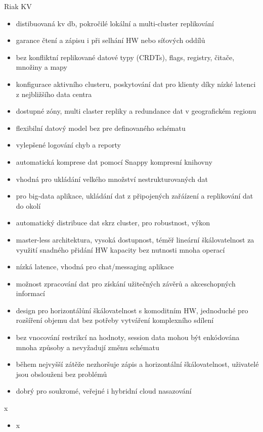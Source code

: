 \documentclass{article}
\begin{document}
	\begin{subsubsection}{Riak KV}
		\begin{itemize}
			\item distibuovaná kv db, pokročilé lokální a multi-cluster replikování
			\item garance čtení a zápisu i při selhání HW nebo síťových oddílů
			\item bez konfliktní replikované datové typy (CRDTs), flags, registry, čitače, množiny a mapy
			\item konfigurace aktivního clusteru, poskytování dat pro klienty díky nízké latenci z nejbližšího data centra
			\item dostupné zóny, multi claster repliky a redundance dat v geografickém regionu
			\item flexibilní datový model bez pre definovaného schématu
			\item vylepšené logování chyb a reporty
			\item automatická komprese dat pomocí Snappy kompresní knihovny
			\item vhodná pro ukládání velkého množství nestrukturovaných dat
			\item pro big-data aplikace, ukládání dat z připojených zařáízení a replikování dat do okolí
			\item automatický distribuce dat skrz cluster, pro robustnost, výkon
			\item master-less architektura, vysoká dostupnost, téměř lineární škálovatelnost za využití snadného přidání HW kapacity bez nutnosti mnoha operací
			\item nízká latence, vhodná pro chat/messaging aplikace
			\item možnost zpracování dat pro získání užitečných závěrů a akceschopných informací
			\item design pro horizontálůní škálovatelnost s komoditním HW, jednoduché pro rozšíření objemu dat bez potřeby vytváření komplexního sdílení
			\item bez vnocování restrikcí na hodnoty, session data mohou být enkódována mnoha způsoby a nevyžadují změnu schématu
			\item během nejvyšší zátěže nezhoršuje zápis a horizontální škálovatelnost, uživatelé jsou obslouženi bez problémů
			\item dobrý pro soukromé, veřejné i hybridní cloud nasazování
		\end{itemize}
	\end{subsubsection}

	\begin{subsubsection}{x}
		\begin{itemize}
			\item x
		\end{itemize}
	\end{subsubsection}
	
\end{document}
